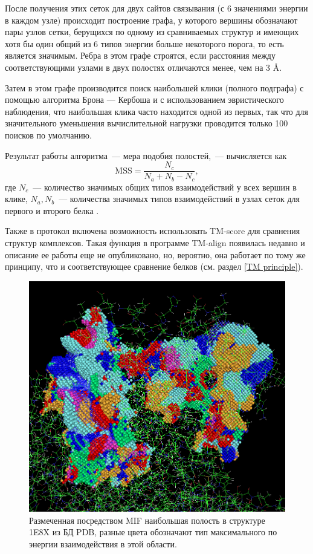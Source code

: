 \documentclass[a4paper,14pt]{article}         %
\begin{document}
После получения этих сеток для двух сайтов связывания (с 6 значениями энергии в каждом узле) происходит построение графа, у которого вершины обозначают пары узлов сетки, берущихся по одному из сравниваемых структур и имеющих хотя бы один общий из 6 типов энергии больше некоторого порога, то есть является значимым. Ребра в этом графе строятся, если расстояния между соответствующими узлами в двух полостях отличаются менее, чем на 3 \AA. 

Затем в этом графе производится поиск наибольшей клики (полного подграфа) с помощью алгоритма Брона — Кербоша \cite{Bron1973, Tomita2006} и с использованием эвристического наблюдения, что наибольшая клика часто находится одной из первых, так что для значительного уменьшения вычислительной нагрузки проводится только 100 поисков по умолчанию. 

Результат работы алгоритма~--- мера подобия полостей,~--- вычисляется как
\begin{equation}
\text{MSS} = \frac{N_c}{N_a + N_b - N_c},
\end{equation}
где $N_c$~--- количество значимых общих типов взаимодействий у всех вершин в клике, $N_a, N_b$~--- количества значимых типов взаимодействий в узлах сеток для первого и второго белка \cite{Chartier2015}.  

Также в протокол включена возможность использовать TM-score для сравнения структур комплексов. Такая функция в программе TM-align появилась недавно и описание ее работы еще не опубликовано, но, вероятно, она работает по тому же принципу, что и соответствующее сравнение белков (см. раздел \ref{TM principle}).
\begin{figure} 
		\centering
		\includegraphics[width=0.6\linewidth]{pictures/mif}
		\caption{Размеченная посредством MIF наибольшая полость в структуре 1E8X из БД PDB, разные цвета обозначают тип максимального по энергии взаимодействия в этой области.}
		\label{fig:mif}
\end{figure}
\newpage
\end{document}
